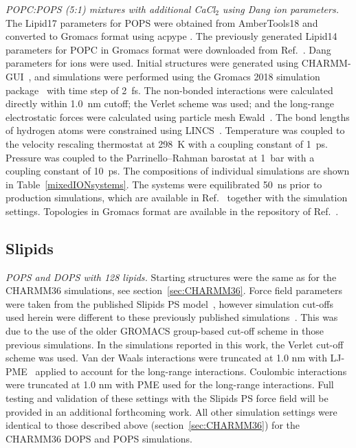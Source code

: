 \documentclass[journal=jpcbfk,manuscript=article]{achemso}
\newcommand{\todo}[1]{\textcolor{red}{#1}}
\begin{document}
\noindent
{\it POPC:POPS (5:1) mixtures with additional CaCl$_2$ using Dang ion parameters.} 
The Lipid17 parameters for POPS were obtained from AmberTools18 \cite{amber18md} 
and converted to Gromacs format using acpype \cite{silva12}.  
The previously generated \cite{botan15} Lipid14 parameters for POPC in Gromacs format were downloaded from Ref.~. 
Dang parameters for ions \cite{smith94, dang06} were used.
Initial structures were generated using CHARMM-GUI~\cite{lee16,jo18}, 
and simulations were performed using the Gromacs 2018 simulation package~\cite{abraham2015gromacs}
with time step of 2~fs. 
The non-bonded interactions were calculated directly within 1.0~nm cutoff; the Verlet scheme was used\cite{Pall13};
and the long-range electrostatic forces were calculated using particle mesh Ewald~\cite{essman95}. 
The bond lengths of hydrogen atoms were constrained using LINCS~\cite{hess97}.
Temperature was coupled to the velocity rescaling thermostat \cite{bussi07} at 298~K with a coupling constant of 1~ps.
Pressure was coupled to the Parrinello--Rahman barostat \cite{parrinello81} at 1~bar with a coupling constant of 10~ps. 
The compositions of individual simulations are shown in Table~\ref{mixedIONsystems}. 
The systems were equilibrated 50~ns prior to production simulations,
which are available in Ref.~ together with the simulation settings. 
Topologies in Gromacs format are available in the repository of Ref.~. 


\subsection{Slipids}
%
%
%
\noindent
{\it POPS and DOPS with 128 lipids.}
Starting structures %
were the same as for the CHARMM36 simulations, see section~\ref{sec:CHARMM36}. Force field parameters were taken from the published Slipids PS model~\cite{jambeck13},
however simulation cut-offs used herein were different to these previously published simulations~\cite{jambeck2012another}.
This was due to the use of the older GROMACS group-based cut-off scheme in those previous simulations.
In the simulations reported in this work, the Verlet cut-off scheme was used. Van der Waals interactions were
truncated at 1.0 nm with LJ-PME~\cite{wennberg15}
applied to account for the long-range interactions.
Coulombic interactions were truncated at 1.0 nm with PME used for the long-range interactions.
Full testing and validation of these settings with the Slipids PS force field will be provided in an additional forthcoming work.
All other simulation settings were identical to those described above (section~\ref{sec:CHARMM36}) for the CHARMM36 DOPS and POPS simulations.
\end{document}

